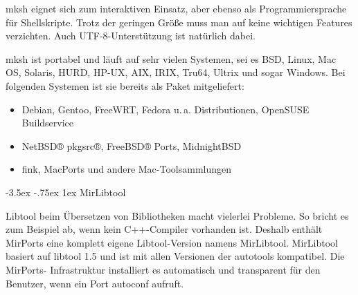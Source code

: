 \documentclass[
a4paper,landscape,11pt,%
notumble%
]{leaflet}
\makeatletter
\newcommand{\sectbox}[1]{%
 \noindent\protect\colorbox{yellow}{%
 \@tempdima=\hsize
 \advance\@tempdima by-2\fboxsep
 \advance\@tempdima by-2\fboxrule
 \protect\parbox{\@tempdima}{%
 \medskip
 \raggedright %
 #1 \medskip
}}}
\renewcommand\section{\@startsection{section}{1}{0.9em}%
  {-3.5ex \@plus -.75ex}%
  {1ex} %
  {\normalfont\Large\itshape\sectbox}}
\makeatother
\begin{document}
mksh eignet sich zum interaktiven Einsatz, aber ebenso als Programmiersprache für Shellskripte. Trotz der geringen Größe muss man auf keine wichtigen Features verzichten. Auch UTF-8-Unterstützung ist natürlich dabei.

mksh ist portabel und läuft auf sehr vielen Systemen, sei es BSD, Linux, Mac OS, Solaris, HURD, HP-UX, AIX, IRIX, Tru64, Ultrix und sogar Windows. Bei folgenden Systemen ist sie bereits als Paket mitgeliefert:

\begin{itemize}
\item Debian, Gentoo, FreeWRT, Fedora u.\,a. Distributionen, OpenSUSE Buildservice
\item NetBSD® pkgsrc®, FreeBSD® Ports, MidnightBSD
\item fink, MacPorts und andere Mac-Toolsammlungen
\end{itemize}

\section{MirLibtool}

Libtool beim Übersetzen von Bibliotheken macht vielerlei Probleme. So bricht es zum Beispiel ab, wenn kein C++-Compiler vorhanden ist. Deshalb enthält MirPorts eine komplett eigene Libtool-Version namens MirLibtool.
MirLibtool basiert auf libtool 1.5 und ist mit allen Versionen der autotools kompatibel. Die MirPorts- Infrastruktur installiert es automatisch und transparent für den Benutzer, wenn ein Port autoconf aufruft.
\end{document}
